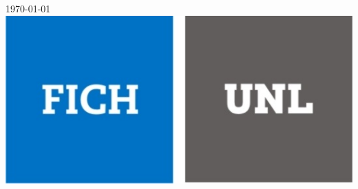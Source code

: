 \documentclass[10pt]{book}
\begin{document}
\begin{titlepage}

{\large \textsc{\monthyeardate\today}}\\[5 cm] %

\includegraphics{img/logo.jpg}\\[3 cm] %
 
\vfill %
\end{titlepage}
\tableofcontents
\end{document}
